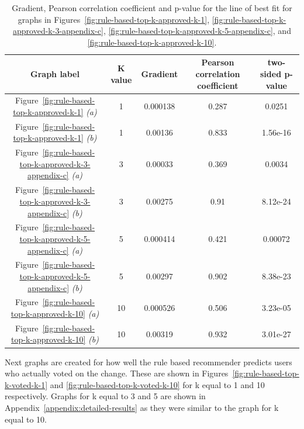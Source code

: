 \begin{table}[H]
    \centering
    \begin{tabular}{@{}c c c c c@{}} 
    \hline
    \textbf{Graph label} & \textbf{K value} & \textbf{Gradient} & \textbf{Pearson correlation coefficient} & \textbf{two-sided p-value} \\
    \hline
Figure~\ref{fig:rule-based-top-k-approved-k-1} \emph{(a)} & 1 & 0.000138 & 0.287 & 0.0251 \\
Figure~\ref{fig:rule-based-top-k-approved-k-1} \emph{(b)} & 1 & 0.00136 & 0.833 & 1.56e-16 \\
Figure~\ref{fig:rule-based-top-k-approved-k-3-appendix-c} \emph{(a)} & 3 & 0.00033 & 0.369 & 0.0034 \\
Figure~\ref{fig:rule-based-top-k-approved-k-3-appendix-c} \emph{(b)} & 3 & 0.00275 & 0.91 & 8.12e-24 \\
Figure~\ref{fig:rule-based-top-k-approved-k-5-appendix-c} \emph{(a)} & 5 & 0.000414 & 0.421 & 0.00072 \\
Figure~\ref{fig:rule-based-top-k-approved-k-5-appendix-c} \emph{(b)} & 5 & 0.00297 & 0.902 & 8.38e-23 \\
Figure~\ref{fig:rule-based-top-k-approved-k-10} \emph{(a)} & 10 & 0.000526 & 0.506 & 3.23e-05 \\
Figure~\ref{fig:rule-based-top-k-approved-k-10} \emph{(b)} & 10 & 0.00319 & 0.932 & 3.01e-27 \\
    \hline
    \end{tabular}
    \caption{Gradient, Pearson correlation coefficient and p-value for the line of best fit for graphs in Figures~\ref{fig:rule-based-top-k-approved-k-1}, \ref{fig:rule-based-top-k-approved-k-3-appendix-c}, \ref{fig:rule-based-top-k-approved-k-5-appendix-c}, and \ref{fig:rule-based-top-k-approved-k-10}.}
    \label{table:top-k-line-of-best-fit-for-approved}
\end{table}

Next graphs are created for how well the rule based recommender predicts users who actually voted on the change. These are shown in Figures~\ref{fig:rule-based-top-k-voted-k-1} and \ref{fig:rule-based-top-k-voted-k-10} for k equal to 1 and 10 respectively. Graphs for k equal to 3 and 5 are shown in Appendix~\ref{appendix:detailed-results} as they were similar to the graph for k equal to 10.

